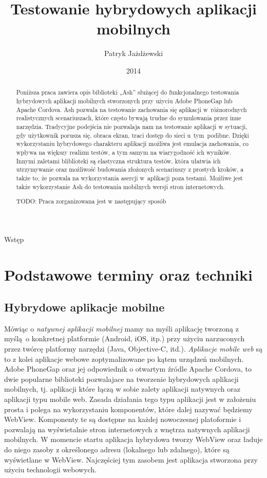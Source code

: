 \documentclass[brudnopis]{xmgr}
\author   {Patryk Jażdżewski}
\title    {Testowanie hybrydowych aplikacji mobilnych}
\date     {2014}
\begin{document}
\begin{abstract}
  Poniższa praca zawiera opis biblioteki „Ash” służącej do funkcjonalnego testowania
hybrydowych aplikacji mobilnych stworzonych przy użyciu Adobe PhoneGap lub
Apache Cordova. Ash pozwala na testowanie zachowania się aplikacji w~różnorodnych
realistycznych scenariuszach, które często bywają trudne do symulowania przez inne narzędzia. Tradycyjne podejścia nie pozwalaja nam na testowanie aplikacji w sytuacji, gdy  użytkownik porusza się,
obraca ekran, traci dostęp do sieci u~tym~podibne. Dzięki wykorzystaniu hybrydowego charakteru aplikacji
możliwa jest emulacja zachowania, co wpływa na większy realizm testów, a tym samym na wiarygodność ich wyników. Innymi
zaletami bliblioteki są elastyczna struktura testów, która ułatwia ich utrzymywanie oraz możliwość budowania złożonych scenariuszy z prostych kroków, a także
to, że pozwala na wykorzystania asercji w~aplikacji poza testami.
Możliwe jest także wykorzystanie Ash do testowania mobilnych wersji stron internetowych. 

TODO: Praca zorganizowana jest w następujący sposób
\end{abstract}

\maketitle

\introduction

Wstęp

\chapter{Podstawowe terminy oraz techniki}
\section{Hybrydowe aplikacje mobilne}
Mówiąc o \textit{natywnej aplikacji mobilnej} mamy na myśli aplikację tworzoną z myślą~o konkretnej platformie (Android, iOS, itp.) przy użyciu narzuconych przez twórcę platformy narzędzi (Java, Objective-C, itd.).  \textit{Aplikacje mobile web} są to z kolei aplikacje webowe zoptymalizowane po kątem urządzeń mobilnych.
Adobe PhoneGap oraz jej odpowiednik o otwartym źródle Apache Cordova, to
dwie popularne biblioteki pozwalajace na tworzenie hybrydowych aplikacji
mobilnych, tj. aplikacji które łączą w sobie zalety aplikacji natywnych oraz aplikacji
typu mobile web. Zasada działania tego typu aplikacji jest w założeniu prosta i
polega na wykorzystaniu komponentów, które dalej nazywać będziemy WebView.
Komponenty te są dostępne na każdej nowoczesnej platoformie i pozwalają na
wyświetalnie stron internetowych z wnętrza natywnych aplikacji mobilnych. 
W momencie startu aplikacja hybrydowa tworzy WebView oraz ładuje do niego zasoby z określonego adresu (lokalnego lub zdalnego), które są wyświetlane w WebView. Najczęściej tym zasobem jest aplikacja stworzona przy użyciu technologii webowych.     
\end{document}
